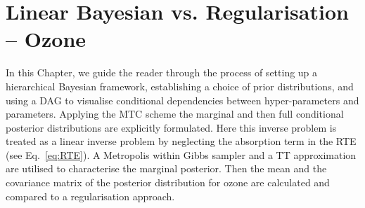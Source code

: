 \chapter{Linear Bayesian vs. Regularisation -- Ozone}
\label{ch:LinVsReg}


In this Chapter, we guide the reader through the process of setting up a hierarchical Bayesian framework, establishing a choice of prior distributions, and using a DAG to visualise conditional dependencies between hyper-parameters and parameters.
Applying the MTC scheme the marginal and then full conditional posterior distributions are explicitly formulated.
Here this inverse problem is treated as a linear inverse problem by neglecting the absorption term in the RTE (see Eq.~\ref{eq:RTE}).
A Metropolis within Gibbs sampler and a TT approximation are utilised to characterise the marginal posterior.
Then the mean and the covariance matrix of the posterior distribution for ozone are calculated and compared to a regularisation approach.


